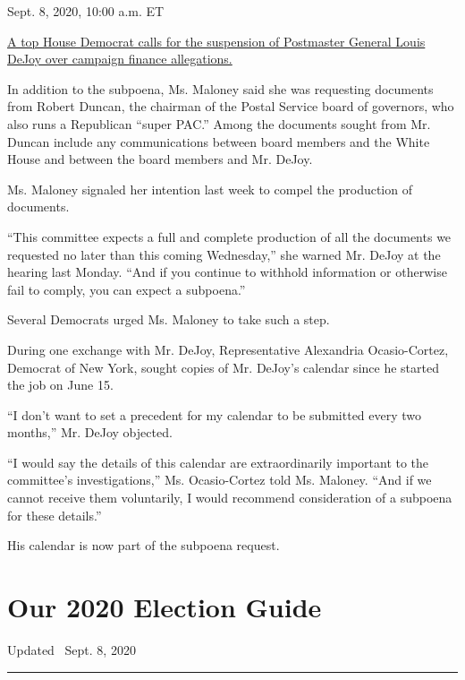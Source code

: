 Sept. 8, 2020, 10:00 a.m. ET

\href{https://www.nytimes3xbfgragh.onion/live/2020/09/08/us/trump-vs-biden\#a-top-house-democrat-calls-for-the-suspension-of-postmaster-general-louis-dejoy-over-campaign-finance-allegations}{A
top House Democrat calls for the suspension of Postmaster General Louis
DeJoy over campaign finance allegations.}

In addition to the subpoena, Ms. Maloney said she was requesting
documents from Robert Duncan, the chairman of the Postal Service board
of governors, who also runs a Republican ``super PAC.'' Among the
documents sought from Mr. Duncan include any communications between
board members and the White House and between the board members and Mr.
DeJoy.

Ms. Maloney signaled her intention last week to compel the production of
documents.

``This committee expects a full and complete production of all the
documents we requested no later than this coming Wednesday,'' she warned
Mr. DeJoy at the hearing last Monday. ``And if you continue to withhold
information or otherwise fail to comply, you can expect a subpoena.''

Several Democrats urged Ms. Maloney to take such a step.

During one exchange with Mr. DeJoy, Representative Alexandria
Ocasio-Cortez, Democrat of New York, sought copies of Mr. DeJoy's
calendar since he started the job on June 15.

``I don't want to set a precedent for my calendar to be submitted every
two months,'' Mr. DeJoy objected.

``I would say the details of this calendar are extraordinarily important
to the committee's investigations,'' Ms. Ocasio-Cortez told Ms. Maloney.
``And if we cannot receive them voluntarily, I would recommend
consideration of a subpoena for these details.''

His calendar is now part of the subpoena request.

\hypertarget{our-2020-election-guide}{%
\section{Our 2020 Election Guide}\label{our-2020-election-guide}}

Updated ~Sept. 8, 2020

\begin{center}\rule{0.5\linewidth}{\linethickness}\end{center}

